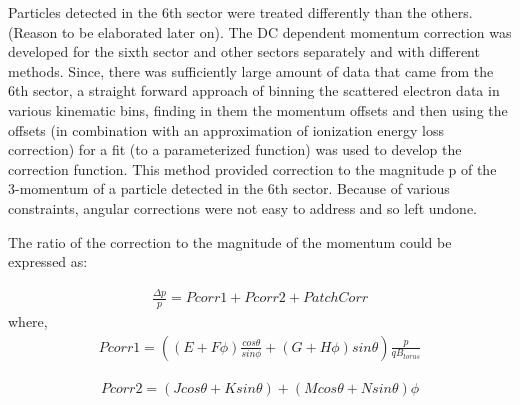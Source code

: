 Particles detected in the 6th sector were treated differently than the others. (Reason to be elaborated later on). The DC dependent momentum correction was developed for the sixth sector and other sectors separately and with different methods. Since, there was sufficiently large amount of data that came from the 6th sector, a straight forward approach of binning the scattered electron data in various kinematic bins, finding in them the momentum offsets and then using the offsets (in combination with an approximation of ionization energy loss correction) for a fit (to a parameterized function) was used to develop the correction function. This method provided correction to the magnitude p of the 3-momentum of a particle detected in the 6th sector. Because of various constraints, angular corrections were not easy to address and so left undone.

The ratio of the correction to the magnitude of the momentum could be expressed as: 

\begin{eqnarray}
\label{eqPCor}
\frac{\Delta p}{p} = Pcorr1 + Pcorr2 + PatchCorr
\end{eqnarray}
where,
\begin{eqnarray}
\label{eqPCor1}
Pcorr1 = \left( (E+F\phi)\frac{cos\theta}{sin\phi} + (G+H\phi)sin\theta   \right) \frac{p}{qB_{torus}} %
\end{eqnarray}


\begin{eqnarray}
\label{eqPCor2}
Pcorr2 = (J cos\theta + K sin\theta) + (M cos\theta+N sin\theta)\phi
\end{eqnarray}

